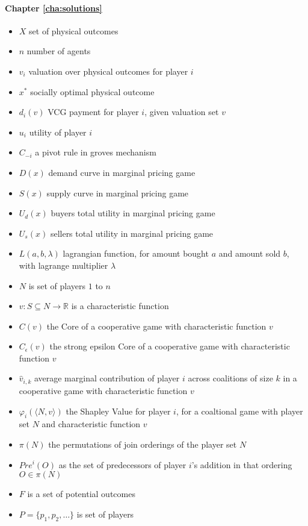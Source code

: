 \paragraph{Chapter \ref{cha:solutions}}
\begin{itemize}
\item	$X$ set of physical outcomes
\item	$n$ number of agents
\item	$v_i$ valuation over physical outcomes for player $i$
\item	$x^*$ socially optimal physical outcome
\item	$d_i(v)$ VCG payment for player $i$, given valuation set $v$
\item	$u_i$ utility of player $i$
\item	$C_{-i}$ a pivot rule in groves mechanism
\item	$D(x)$ demand curve in marginal pricing game
\item	$S(x)$ supply curve in marginal pricing game
\item	$U_d(x)$ buyers total utility in marginal pricing game
\item	$U_s(x)$ sellers total utility in marginal pricing game
\item	$L(a,b,\lambda)$ lagrangian function, for amount bought $a$ and amount sold $b$, with lagrange multiplier $\lambda$
\item	$N$ is set of players $1$ to $n$
\item	$v: S\subseteq N \rightarrow \mathbb{R}$ is a characteristic function
\item	$C(v)$ the Core of a cooperative game with characteristic function $v$
\item	$C_\epsilon(v)$ the strong epsilon Core of a cooperative game with characteristic function $v$
\item	$\hat{v}_{i,k}$ average marginal contribution of player $i$ across coalitions of size $k$ in a cooperative game with characteristic function $v$
\item	$\varphi_i(\langle N,v\rangle)$ the Shapley Value for player $i$, for a coaltional game with player set $N$ and characteristic function $v$
\item	$\pi(N)$ the permutations of join orderings of the player set $N$
\item	$Pre^i(O)$ as the set of predecessors of player $i$'s addition in that ordering $O\in \pi(N)$
\item	$F$ is a set of potential outcomes
\item	$P=\{p_1,p_2,\dots\}$ is set of players

\end{itemize}
